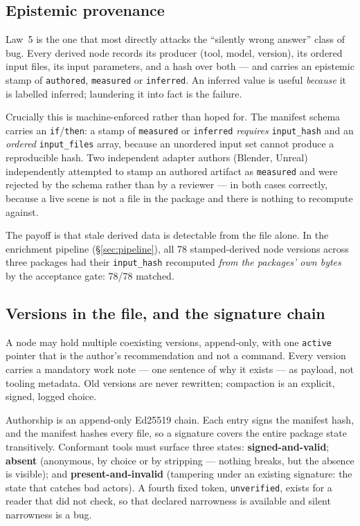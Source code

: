 \documentclass[10pt,twocolumn,letterpaper]{article}
\newcommand{\code}[1]{\texttt{\small #1}}
\begin{document}
\subsection{Epistemic provenance}

Law~5 is the one that most directly attacks the ``silently wrong answer'' class of
bug. Every derived node records its producer (tool, model, version), its ordered
input files, its input parameters, and a hash over both --- and carries an
epistemic stamp of \code{authored}, \code{measured} or \code{inferred}. An
inferred value is useful \emph{because} it is labelled inferred; laundering it
into fact is the failure.

Crucially this is machine-enforced rather than hoped for. The manifest schema
carries an \code{if}/\code{then}: a stamp of \code{measured} or \code{inferred}
\emph{requires} \code{input\_hash} and an \emph{ordered} \code{input\_files}
array, because an unordered input set cannot produce a reproducible hash. Two
independent adapter authors (Blender, Unreal) independently attempted to stamp an
authored artifact as \code{measured} and were rejected by the schema rather than
by a reviewer --- in both cases correctly, because a live scene is not a file in
the package and there is nothing to recompute against.

The payoff is that stale derived data is detectable from the file alone. In the
enrichment pipeline (\S\ref{sec:pipeline}), all 78 stamped-derived node versions
across three packages had their \code{input\_hash} recomputed \emph{from the
packages' own bytes} by the acceptance gate: 78/78 matched.

\subsection{Versions in the file, and the signature chain}

A node may hold multiple coexisting versions, append-only, with one \code{active}
pointer that is the author's recommendation and not a command. Every version
carries a mandatory work note --- one sentence of why it exists --- as payload,
not tooling metadata. Old versions are never rewritten; compaction is an
explicit, signed, logged choice.

Authorship is an append-only Ed25519 chain. Each entry signs the manifest hash,
and the manifest hashes every file, so a signature covers the entire package state
transitively. Conformant tools must surface three states:
\textbf{signed-and-valid}; \textbf{absent} (anonymous, by choice or by stripping
--- nothing breaks, but the absence is visible); and \textbf{present-and-invalid}
(tampering under an existing signature: the state that catches bad actors). A
fourth fixed token, \code{unverified}, exists for a reader that did not check, so
that declared narrowness is available and silent narrowness is a bug.
\end{document}
